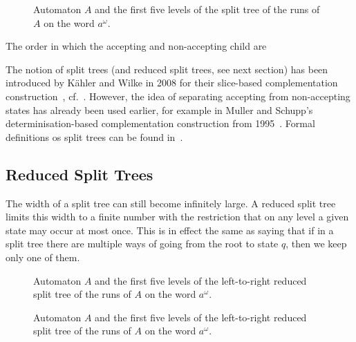 \begin{figure}
\begin{center}
\Automaton
\hfil
\SplitTreeRightLeft
\end{center}
\caption{Automaton $A$ and the first five levels of the split tree of the runs of $A$ on the word $a^\omega$.}
\label{split_tree}
\end{figure}


The order in which the accepting and non-accepting child are 

The notion of split trees (and reduced split trees, see next section) has been introduced by Kähler and Wilke in 2008 for their slice-based complementation construction~\cite{2008_kaehler}, cf.~\cite{fogarty2013unifying}. However, the idea of separating accepting from non-accepting states has already been used earlier, for example in Muller and Schupp's determinisation-based complementation construction from 1995~\cite{Muller199569}. Formal definitions os split trees can be found in~\cite{2008_kaehler}\cite{fogarty2013unifying}.

\subsection{Reduced Split Trees}
The width of a split tree can still become infinitely large. A reduced split tree limits this width to a finite number with the restriction that on any level a given state may occur at most once. This is in effect the same as saying that if in a split tree there are multiple ways of going from the root to state $q$, then we keep only one of them.

\begin{figure}
\begin{center}
\Automaton
\hfil
\ReducedSplitTreeLeftRight
\end{center}
\caption{Automaton $A$ and the first five levels of the left-to-right reduced split tree of the runs of $A$ on the word $a^\omega$.}
\label{r_split_tree_lr}
\end{figure}

\begin{figure}
\begin{center}
\Automaton
\hfil
\ReducedSplitTreeRightLeft
\end{center}
\caption{Automaton $A$ and the first five levels of the left-to-right reduced split tree of the runs of $A$ on the word $a^\omega$.}
\label{r_split_tree_rl}
\end{figure}


